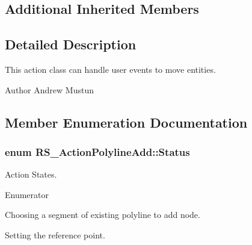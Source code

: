 \subsection*{Additional Inherited Members}


\subsection{Detailed Description}
This action class can handle user events to move entities.

\begin{DoxyAuthor}{Author}
Andrew Mustun 
\end{DoxyAuthor}


\subsection{Member Enumeration Documentation}
\hypertarget{classRS__ActionPolylineAdd_a308fb4151994757401d605f4e43c9bad}{
\subsubsection[{Status}]{\setlength{\rightskip}{0pt plus 5cm}enum {\bf R\-S\-\_\-\-Action\-Polyline\-Add\-::\-Status}}}\label{classRS__ActionPolylineAdd_a308fb4151994757401d605f4e43c9bad}
Action States. \begin{Desc}
\item[Enumerator]\par
\begin{description}
\item[{\em 
\hypertarget{classRS__ActionPolylineAdd_a308fb4151994757401d605f4e43c9badab487b856c111389881bf82d1e7360753}{Choose\-Segment}\label{classRS__ActionPolylineAdd_a308fb4151994757401d605f4e43c9badab487b856c111389881bf82d1e7360753}
}]Choosing a segment of existing polyline to add node. \item[{\em 
\hypertarget{classRS__ActionPolylineAdd_a308fb4151994757401d605f4e43c9bada756bec60664d9551aaf8f42b4f6f32d3}{Set\-Add\-Coord}\label{classRS__ActionPolylineAdd_a308fb4151994757401d605f4e43c9bada756bec60664d9551aaf8f42b4f6f32d3}
}]Setting the reference point. \end{description}
\end{Desc}


